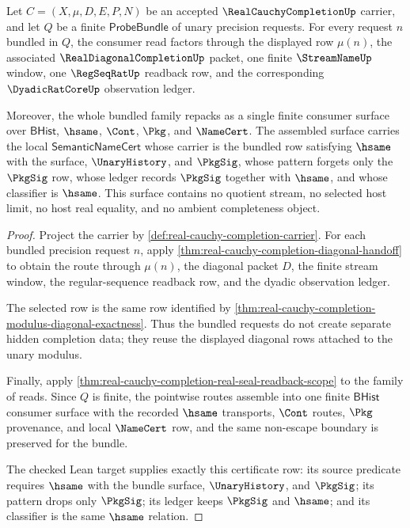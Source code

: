 \begin{theorem}
\label{thm:real-cauchy-completion-probebundle-window-coverage}
Let $C=(X,\mu,D,E,P,N)$ be an accepted $\RealCauchyCompletionUp$ carrier, and let $Q$ be a finite $\mathsf{ProbeBundle}$ of unary precision requests. For every request $n$ bundled in $Q$, the consumer read factors through the displayed row $\mu(n)$, the associated $\RealDiagonalCompletionUp$ packet, one finite $\StreamNameUp$ window, one $\RegSeqRatUp$ readback row, and the corresponding $\DyadicRatCoreUp$ observation ledger.

Moreover, the whole bundled family repacks as a single finite consumer surface over $\mathsf{BHist}$, $\hsame$, $\Cont$, $\Pkg$, and $\NameCert$. The assembled surface carries the local $\mathsf{SemanticNameCert}$ whose carrier is the bundled row satisfying $\hsame$ with the surface, $\UnaryHistory$, and $\PkgSig$, whose pattern forgets only the $\PkgSig$ row, whose ledger records $\PkgSig$ together with $\hsame$, and whose classifier is $\hsame$. This surface contains no quotient stream, no selected host limit, no host real equality, and no ambient completeness object.
\end{theorem}
\begin{proof}
Project the carrier by \autoref{def:real-cauchy-completion-carrier}. For each bundled precision request $n$, apply \autoref{thm:real-cauchy-completion-diagonal-handoff} to obtain the route through $\mu(n)$, the diagonal packet $D$, the finite stream window, the regular-sequence readback row, and the dyadic observation ledger.

The selected row is the same row identified by \autoref{thm:real-cauchy-completion-modulus-diagonal-exactness}. Thus the bundled requests do not create separate hidden completion data; they reuse the displayed diagonal rows attached to the unary modulus.

Finally, apply \autoref{thm:real-cauchy-completion-real-seal-readback-scope} to the family of reads. Since $Q$ is finite, the pointwise routes assemble into one finite $\mathsf{BHist}$ consumer surface with the recorded $\hsame$ transports, $\Cont$ routes, $\Pkg$ provenance, and local $\NameCert$ row, and the same non-escape boundary is preserved for the bundle.

The checked Lean target supplies exactly this certificate row: its source predicate requires $\hsame$ with the bundle surface, $\UnaryHistory$, and $\PkgSig$; its pattern drops only $\PkgSig$; its ledger keeps $\PkgSig$ and $\hsame$; and its classifier is the same $\hsame$ relation.
\end{proof}

